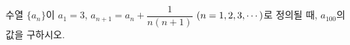 수열 $\{a_n\}$이 $a_1=3$, $a_{n+1}=a_n+\dfrac{1}{n(n+1)}$ $(n=1{,}\mkern3mu\mathopen{}2{,}\mkern3mu\mathopen{}3{,}\mkern3mu\mathopen{}\cdots)$로 정의될 때, $a_{100}$의 값을 구하시오.
